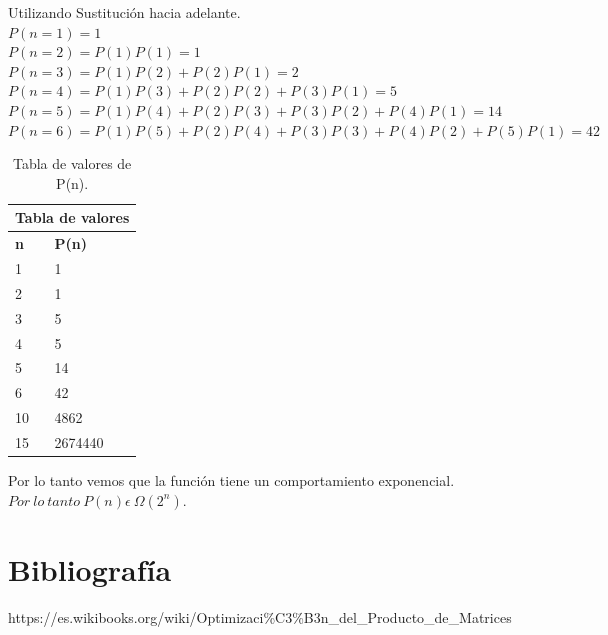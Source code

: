 \documentclass[12pt]{report}
\begin{document}
	Utilizando Sustitución hacia adelante.\\
	$P(n=1)=1$\\
	$P(n=2)=P(1)P(1)=1$\\
	$P(n=3)=P(1)P(2)+P(2)P(1)=2$\\
	$P(n=4)=P(1)P(3)+P(2)P(2)+P(3)P(1)=5$\\
	$P(n=5)=P(1)P(4)+P(2)P(3)+P(3)P(2)+P(4)P(1)=14$\\
	$P(n=6)=P(1)P(5)+P(2)P(4)+P(3)P(3)+P(4)P(2)+P(5)P(1)=42$\\
	
	\begin{table}[htbp]
		\begin{center}
			\begin{tabular}{|l|l|}
				\hline
				\multicolumn{2}{|c|}{Tabla de valores} \\ 
				\hline
				\textbf{n} & \textbf{P(n)}\\
				\hline
				1 & 1 \\ \hline
				2 & 1 \\ \hline
				3 & 5 \\ \hline
				4 & 5 \\ \hline
				5 & 14 \\ \hline
				6 & 42 \\ \hline
				10 & 4862 \\ \hline
				15 & 2674440 \\ \hline
				
			\end{tabular}
			\caption{Tabla de valores de P(n).}
			\label{tabla:analisis1}
		\end{center}
	\end{table}

Por lo tanto vemos que la función tiene un comportamiento exponencial.\\
 
	$Por \ lo \ tanto \ P(n)  \epsilon \ \Omega (2^{n}).$\\
	\newpage

\section{Bibliografía}

https://es.wikibooks.org/wiki/Optimizaci\%C3\%B3n\_del\_Producto\_de\_Matrices
	
\end{document}
